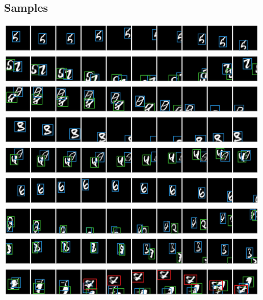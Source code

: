 \subsection{Samples}
\begin{center}
    \includegraphics[width=\linewidth]{figures/SQAIR/mnist_samples/000044.png}
    \includegraphics[width=\linewidth]{figures/SQAIR/mnist_samples/000059.png}
    \includegraphics[width=\linewidth]{figures/SQAIR/mnist_samples/000060.png}
    \includegraphics[width=\linewidth]{figures/SQAIR/mnist_samples/000062.png}
    \includegraphics[width=\linewidth]{figures/SQAIR/mnist_samples/000071.png}
    \includegraphics[width=\linewidth]{figures/SQAIR/mnist_samples/000073.png}
    \includegraphics[width=\linewidth]{figures/SQAIR/mnist_samples/000092.png}
    \includegraphics[width=\linewidth]{figures/SQAIR/mnist_samples/000157.png}
    \includegraphics[width=\linewidth]{figures/SQAIR/mnist_sample_curious/000089.png}
    \label{fig:mnist_samples_additional}
\end{center}


